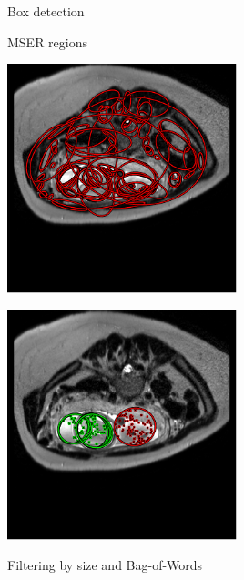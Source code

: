 \documentclass[12pt]{beamer}
\begin{document}
\begin{frame}{Box detection}
\begin{minipage}{0.3\textwidth}
MSER regions
\end{minipage}
\begin{minipage}{0.65\textwidth}
\centering
\includegraphics[width=0.5\textwidth,clip=true,trim=0 51 0 0]{30_all_mser.pdf}

\includegraphics[width=0.5\textwidth,clip=true,trim=0 51 0 0]{30_selected_mser.pdf}

Filtering by size and Bag-of-Words
\end{minipage}
\end{frame}
\end{document}
